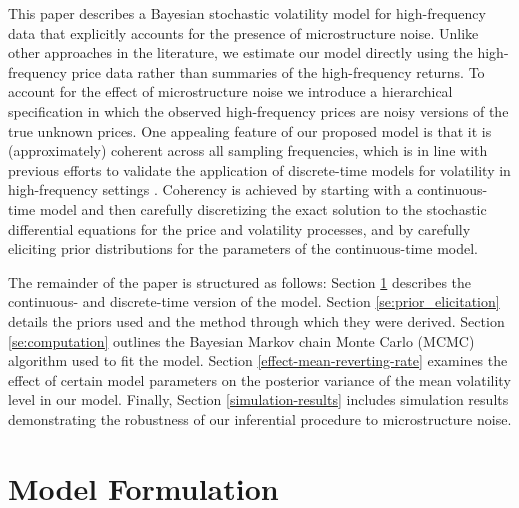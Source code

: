\documentclass[10pt]{article}
\begin{document}
This paper describes a Bayesian stochastic volatility model for high-frequency data that explicitly accounts for the presence of microstructure noise.  Unlike other approaches in the literature, we estimate our model directly using the high-frequency price data rather than summaries of the high-frequency returns.  To account for the effect of microstructure noise we introduce a hierarchical specification in which the observed high-frequency prices are noisy versions of the true unknown prices.  One appealing feature of our proposed model is that it is (approximately) coherent across all sampling frequencies, which is in line with previous efforts to validate the application of discrete-time models for volatility in high-frequency settings \citep{andersen1999forecasting}.  Coherency is achieved by starting with a continuous-time model and then carefully discretizing the exact solution to the stochastic differential equations for the price and volatility processes, and by carefully eliciting prior distributions for the parameters of the continuous-time model.

The remainder of the paper is structured as follows:  Section \ref{se:model_formulation} describes the continuous- and discrete-time version of the model. Section \ref{se:prior_elicitation} details the priors used and the method through which they were derived. Section \ref{se:computation} outlines the Bayesian Markov chain Monte Carlo (MCMC) algorithm used to fit the model. Section \ref{effect-mean-reverting-rate} examines the effect of certain model parameters on the posterior variance of the mean volatility level in our model. Finally, Section \ref{simulation-results} includes simulation results demonstrating the robustness of our inferential procedure to microstructure noise.

\section{Model Formulation}\label{se:model_formulation}
\end{document}

